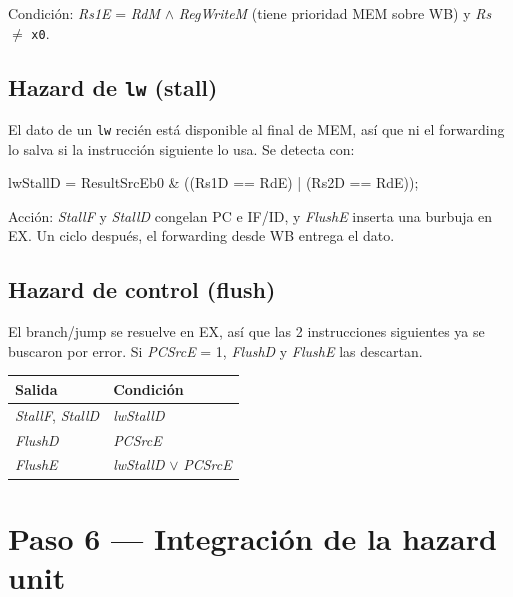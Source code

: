 \documentclass[11pt,a4paper]{article}
\newcommand{\sig}[1]{\textit{#1}}
\newcommand{\ins}[1]{\texttt{#1}}
\begin{document}
Condición: \sig{Rs1E} = \sig{RdM} $\wedge$ \sig{RegWriteM} (tiene prioridad MEM sobre WB) y \sig{Rs} $\neq$ \ins{x0}.

\subsection{Hazard de \texttt{lw} (stall)}

El dato de un \ins{lw} recién está disponible al final de MEM, así que ni el forwarding lo salva si la instrucción siguiente lo usa. Se detecta con:

\begin{hdl}
lwStallD = ResultSrcEb0 & ((Rs1D == RdE) | (Rs2D == RdE));
\end{hdl}

Acción: \sig{StallF} y \sig{StallD} congelan PC e IF/ID, y \sig{FlushE} inserta una burbuja en EX. Un ciclo después, el forwarding desde WB entrega el dato.

\subsection{Hazard de control (flush)}

El branch/jump se resuelve en EX, así que las 2 instrucciones siguientes ya se buscaron por error. Si \sig{PCSrcE} = 1, \sig{FlushD} y \sig{FlushE} las descartan.

\begin{center}
\begin{tabular}{@{}ll@{}}
\toprule
Salida & Condición \\
\midrule
\sig{StallF}, \sig{StallD} & \sig{lwStallD} \\
\sig{FlushD} & \sig{PCSrcE} \\
\sig{FlushE} & \sig{lwStallD} $\vee$ \sig{PCSrcE} \\
\bottomrule
\end{tabular}
\end{center}

\section{Paso 6 --- Integración de la hazard unit}
\end{document}

